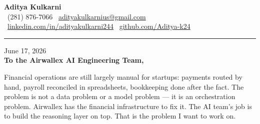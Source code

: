 \documentclass[11pt,letterpaper]{article}
\begin{document}
\begin{center}
    {\Huge \textbf{\color{AirwallexNavy} Aditya Kulkarni}}\\[8pt]
    {\color{DarkGrey} \small
    \faPhone \ (281) 876-7066 \quad \textbar \quad
    \faEnvelope \ \href{mailto:adityakulkarnius@gmail.com}{adityakulkarnius@gmail.com} \\[4pt]
    \faLinkedin \ \href{https://linkedin.com/in/adityakulkarni244}{linkedin.com/in/adityakulkarni244} \quad \textbar \quad
    \faGithub \ \href{https://github.com/Aditya-k24}{github.com/Aditya-k24}
    }
\end{center}

\vspace{-4pt}
{\color{AirwallexNavy}\rule{\linewidth}{1.5pt}}
\vspace{10pt}

June 17, 2026\\[10pt]
\textbf{To the Airwallex AI Engineering Team,}

\vspace{6pt}

Financial operations are still largely manual for startups: payments routed by hand, payroll reconciled in spreadsheets, bookkeeping done after the fact. The problem is not a data problem or a model problem --- it is an orchestration problem. Airwallex has the financial infrastructure to fix it. The AI team's job is to build the reasoning layer on top. That is the problem I want to work on.

\vspace{4pt}
\end{document}
